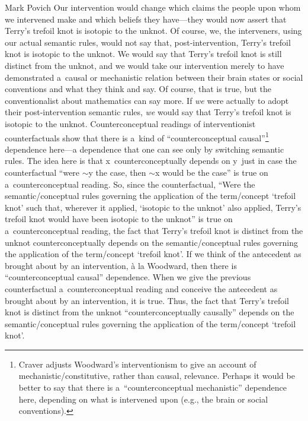 \begin{artengenv}{Mark Povich}
Our intervention would change which claims the people upon whom we intervened make and which beliefs they have---they would now assert that Terry's trefoil knot is isotopic to the unknot. Of course, we, the interveners, using our actual semantic rules, would not say that, post-intervention, Terry's trefoil knot is isotopic to the unknot. We would say that Terry's trefoil knot is still distinct from the unknot, and we would take our intervention merely to have demonstrated a~causal or mechanistic relation between their brain states or social conventions and what they think and say. Of course, that is true, but the conventionalist about mathematics can say more. If \textit{we} were actually to adopt their post-intervention semantic rules, \textit{we} would say that Terry's trefoil knot is isotopic to the unknot. Counterconceptual readings of interventionist counterfactuals show that there is a~kind of ``counterconceptual causal''\footnote{Craver
\parencites*[][]{lyon_explanatory_2007}[][]{craver_constitutive_2021} %
 adjusts Woodward's interventionism to give an account of mechanistic/constitutive, rather than causal, relevance. Perhaps it would be better to say that there is a~``counterconceptual mechanistic'' dependence here, depending on what is intervened upon (e.g., the brain or social conventions).} dependence here---a dependence that one can see only by switching semantic rules. The idea here is that x~counterconceptually depends on y~just in case the counterfactual ``were ${\sim}$y the case, then ${\sim}$x would be the case'' is true on a~counterconceptual reading. So, since the counterfactual, ``Were the semantic/conceptual rules governing the application of the term/concept ‘trefoil knot' such that, wherever it applied, ‘isotopic to the unknot' also applied, Terry's trefoil knot would have been isotopic to the unknot'' is true on a~counterconceptual reading, the fact that Terry's trefoil knot is distinct from the unknot counterconceptually depends on the semantic/conceptual rules governing the application of the term/concept ‘trefoil knot'. If we think of the antecedent as brought about by an intervention, à la Woodward, then there is ``counterconceptual causal'' dependence. When we give the previous counterfactual a~counterconceptual reading and conceive the antecedent as brought about by an intervention, it is true. Thus, the fact that Terry's trefoil knot is distinct from the unknot ``counterconceptually causally'' depends on the semantic/conceptual rules governing the application of the term/concept ‘trefoil knot'.


\end{artengenv}
